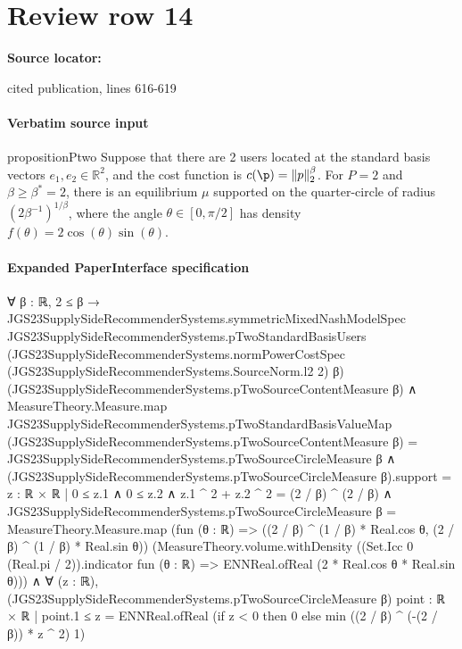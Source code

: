 \documentclass[10pt]{article}
\begin{document}
\section*{Review row 14}
\textbf{Source locator:} {\footnotesize\raggedright cited publication, lines 616-\allowbreak{}619\par}
\paragraph{Verbatim source input}
\begin{ReviewVerbatim}
\begin{restatable}{proposition}{Ptwo}
\label{prop:P2}
Suppose that there are 2 users located at the standard basis vectors $e_1, e_2 \in \mathbb{R}^2$, and the cost function is $c(\p) = \|p\|_2^{\beta}$. For $P = 2$ and $\beta \ge \beta^* = 2$, there is an equilibrium $\mu$ supported on the quarter-circle of radius $(2 \beta^{-1})^{1/\beta}$, where the angle $\theta \in [0, \pi/2]$ has density $f(\theta) = 2 \cos(\theta) \sin(\theta)$.
\end{restatable}
\end{ReviewVerbatim}



\paragraph{Expanded PaperInterface specification}
\begin{ReviewVerbatim}
∀ {β : ℝ},
  2 ≤ β →
    JGS23SupplySideRecommenderSystems.symmetricMixedNashModelSpec
        JGS23SupplySideRecommenderSystems.pTwoStandardBasisUsers
        (JGS23SupplySideRecommenderSystems.normPowerCostSpec (JGS23SupplySideRecommenderSystems.SourceNorm.l2 2) β)
        (JGS23SupplySideRecommenderSystems.pTwoSourceContentMeasure β) ∧
      MeasureTheory.Measure.map JGS23SupplySideRecommenderSystems.pTwoStandardBasisValueMap
            (JGS23SupplySideRecommenderSystems.pTwoSourceContentMeasure β) =
          JGS23SupplySideRecommenderSystems.pTwoSourceCircleMeasure β ∧
        (JGS23SupplySideRecommenderSystems.pTwoSourceCircleMeasure β).support =
            {z : ℝ × ℝ | 0 ≤ z.1 ∧ 0 ≤ z.2 ∧ z.1 ^ 2 + z.2 ^ 2 = (2 / β) ^ (2 / β)} ∧
          JGS23SupplySideRecommenderSystems.pTwoSourceCircleMeasure β =
              MeasureTheory.Measure.map
                (fun (θ : ℝ) => ((2 / β) ^ (1 / β) * Real.cos θ, (2 / β) ^ (1 / β) * Real.sin θ))
                (MeasureTheory.volume.withDensity
                  ((Set.Icc 0 (Real.pi / 2)).indicator fun (θ : ℝ) => ENNReal.ofReal (2 * Real.cos θ * Real.sin θ))) ∧
            ∀ (z : ℝ),
              (JGS23SupplySideRecommenderSystems.pTwoSourceCircleMeasure β) {point : ℝ × ℝ | point.1 ≤ z} =
                ENNReal.ofReal (if z < 0 then 0 else min ((2 / β) ^ (-(2 / β)) * z ^ 2) 1)
\end{ReviewVerbatim}
\end{document}
